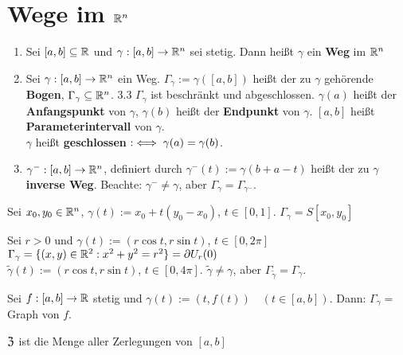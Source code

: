 \documentclass[a4paper,oneside,DIV15,BCOR12mm,chapterprefix=true,headings=onelinechapter]{scrbook}
\begin{document}
\chapter{Wege im $\mathbb{R}^n$}
 
\begin{definition}
\begin{enumerate}
\item Sei $[a,b]\subseteq \mathbb{R}$ und $\gamma: [a,b] \to \mathbb{R}^n$ sei stetig. Dann heißt $\gamma$ ein \textbf{Weg} im $\mathbb{R}^n$
\item Sei $\gamma :[a,b] \to \mathbb{R}^n$ ein Weg. $\Gamma_\gamma := \gamma([a,b])$ heißt der zu $\gamma$ gehörende \textbf{Bogen}, $\Gamma_\gamma \subseteq \mathbb{R}^n$. 3.3 \folgt{} $\Gamma_\gamma$ ist beschränkt und abgeschlossen.
$\gamma(a)$ heißt der \textbf{Anfangspunkt} von $\gamma$, $\gamma(b)$ heißt der \textbf{Endpunkt} von $\gamma$. $[a,b]$ heißt \textbf{Parameterintervall} von $\gamma$. \\
$\gamma$ heißt \textbf{geschlossen} $:\iff \gamma(a) = \gamma(b)$.
\item $\gamma^-:[a,b]\to \mathbb{R}^n$, definiert durch $\gamma^-(t):=\gamma(b+a-t)$ heißt der zu $\gamma$ \textbf{inverse Weg}. Beachte: $\gamma^- \ne \gamma$, aber $\Gamma_\gamma = \Gamma_{\gamma^-}$.
\end{enumerate}
\end{definition}

\begin{beispiele}
\item Sei $x_0, y_0\in\mathbb{R}^n$, $\gamma(t) := x_0 + t(y_0-x_0)$, $t\in[0,1]$. $\Gamma_\gamma=S[x_0,y_0]$
\item Sei $r>0$ und $\gamma(t) := (r \cos t, r \sin t)$, $t\in[0,2\pi]$\\ $\Gamma_\gamma=\{(x,y)\in\mathbb{R}^2: x^2+y^2=r^2\} = \partial U_r(0)$ \\
$\tilde\gamma(t) := (r \cos t, r \sin t)$, $t\in[0,4\pi]$. $\tilde\gamma \ne \gamma$, aber $\Gamma_{\tilde\gamma} = \Gamma_\gamma$.
\item Sei $f:[a,b] \to \mathbb{R}$ stetig und $\gamma(t) := (t, f(t)) \quad (t \in [a,b])$. Dann: $\Gamma_\gamma = $ Graph von $f$.
\end{beispiele}

\begin{erinnerung}
$\mathfrak{Z}$ ist die Menge aller Zerlegungen von $[a,b]$
\end{erinnerung}
\end{document}
